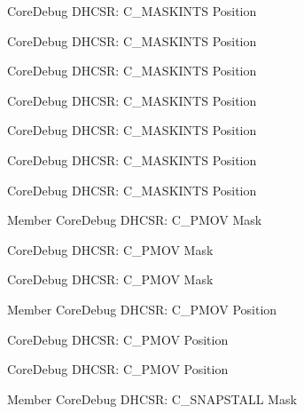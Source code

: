 \begin{DoxyRefList}
\label{deprecated__deprecated000177}%
%
Core\+Debug DHCSR\+: C\+\_\+\+MASKINTS Position 

\label{deprecated__deprecated000121}%
%
Core\+Debug DHCSR\+: C\+\_\+\+MASKINTS Position 

\label{deprecated__deprecated000586}%
%
Core\+Debug DHCSR\+: C\+\_\+\+MASKINTS Position 

\label{deprecated__deprecated000033}%
%
Core\+Debug DHCSR\+: C\+\_\+\+MASKINTS Position 

\label{deprecated__deprecated000484}%
%
Core\+Debug DHCSR\+: C\+\_\+\+MASKINTS Position 

\label{deprecated__deprecated000395}%
%
Core\+Debug DHCSR\+: C\+\_\+\+MASKINTS Position 

\label{deprecated__deprecated000319}%
%
Core\+Debug DHCSR\+: C\+\_\+\+MASKINTS Position  
\item[Member \doxylink{group__CMSIS__SCB_ga6c41fddb98d97a17f3e9020278a1aed1}{Core\+Debug\+\_\+\+DHCSR\+\_\+\+C\+\_\+\+PMOV\+\_\+\+Msk} ]\label{deprecated__deprecated000481}%
%
Core\+Debug DHCSR\+: C\+\_\+\+PMOV Mask 

\label{deprecated__deprecated000583}%
%
Core\+Debug DHCSR\+: C\+\_\+\+PMOV Mask 

\label{deprecated__deprecated000030}%
%
Core\+Debug DHCSR\+: C\+\_\+\+PMOV Mask  
\item[Member \doxylink{group__CMSIS__SCB_gac414659dd5c8bd9c91ab94441ded720a}{Core\+Debug\+\_\+\+DHCSR\+\_\+\+C\+\_\+\+PMOV\+\_\+\+Pos} ]\label{deprecated__deprecated000582}%
%
Core\+Debug DHCSR\+: C\+\_\+\+PMOV Position 

\label{deprecated__deprecated000480}%
%
Core\+Debug DHCSR\+: C\+\_\+\+PMOV Position 

\label{deprecated__deprecated000029}%
%
Core\+Debug DHCSR\+: C\+\_\+\+PMOV Position  
\item[Member \doxylink{group__CMSIS__CoreDebug_ga53aa99b2e39a67622f3b9973e079c2b4}{Core\+Debug\+\_\+\+DHCSR\+\_\+\+C\+\_\+\+SNAPSTALL\+\_\+\+Msk} ]\label{deprecated__deprecated000176}%
%
Core\+Debug DHCSR\+: C\+\_\+\+SNAPSTALL Mask 


\end{DoxyRefList}
